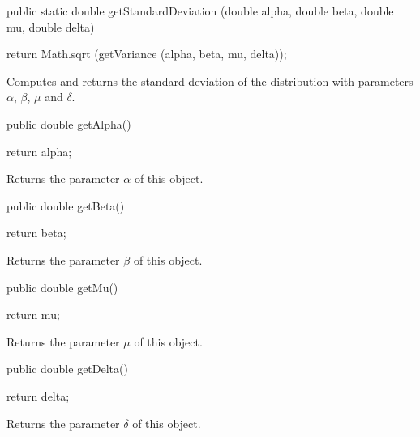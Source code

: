\begin{code}

   public static double getStandardDeviation (double alpha, double beta,
                                              double mu, double delta)\begin{hide} {
      return Math.sqrt (getVariance (alpha, beta, mu, delta));
   }\end{hide}
\end{code}
\begin{tabb}  Computes and returns the standard deviation of the \nig{}
 distribution with parameters $\alpha$, $\beta$, $\mu$ and $\delta$.
\end{tabb}
\begin{htmlonly}
\end{htmlonly}
\begin{code}

   public double getAlpha()\begin{hide} {
      return alpha;
   }\end{hide}
\end{code}
 \begin{tabb} Returns the parameter $\alpha$ of this object.
 \end{tabb}
\begin{code}

   public double getBeta()\begin{hide} {
      return beta;
   }\end{hide}
\end{code}
 \begin{tabb} Returns the parameter $\beta$ of this object.
 \end{tabb}
\begin{code}

   public double getMu()\begin{hide} {
      return mu;
   }\end{hide}
\end{code}
 \begin{tabb} Returns the parameter $\mu$ of this object.
 \end{tabb}
\begin{code}

   public double getDelta()\begin{hide} {
      return delta;
   }\end{hide}
\end{code}
 \begin{tabb} Returns the parameter $\delta$ of this object.
 \end{tabb}
